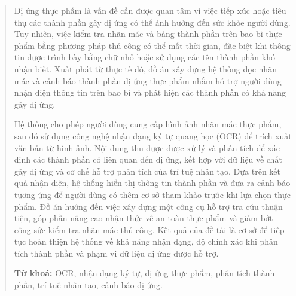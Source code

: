 \begin{abstract}

Dị ứng thực phẩm là vấn đề cần được quan tâm vì việc tiếp xúc hoặc tiêu thụ các thành phần gây dị ứng có thể ảnh hưởng đến sức khỏe người dùng. Tuy nhiên, việc kiểm tra nhãn mác và bảng thành phần trên bao bì thực phẩm bằng phương pháp thủ công có thể mất thời gian, đặc biệt khi thông tin được trình bày bằng chữ nhỏ hoặc sử dụng các tên thành phần khó nhận biết. Xuất phát từ thực tế đó, đồ án xây dựng hệ thống đọc nhãn mác và cảnh báo thành phần dị ứng thực phẩm nhằm hỗ trợ người dùng nhận diện thông tin trên bao bì và phát hiện các thành phần có khả năng gây dị ứng.

Hệ thống cho phép người dùng cung cấp hình ảnh nhãn mác thực phẩm, sau đó sử dụng công nghệ nhận dạng ký tự quang học (OCR) để trích xuất văn bản từ hình ảnh. Nội dung thu được được xử lý và phân tích để xác định các thành phần có liên quan đến dị ứng, kết hợp với dữ liệu về chất gây dị ứng và cơ chế hỗ trợ phân tích của trí tuệ nhân tạo. Dựa trên kết quả nhận diện, hệ thống hiển thị thông tin thành phần và đưa ra cảnh báo tương ứng để người dùng có thêm cơ sở tham khảo trước khi lựa chọn thực phẩm. Đồ án hướng đến việc xây dựng một công cụ hỗ trợ tra cứu thuận tiện, góp phần nâng cao nhận thức về an toàn thực phẩm và giảm bớt công sức kiểm tra nhãn mác thủ công. Kết quả của đề tài là cơ sở để tiếp tục hoàn thiện hệ thống về khả năng nhận dạng, độ chính xác khi phân tích thành phần và phạm vi dữ liệu dị ứng được hỗ trợ.

\vspace{0.8em}
\noindent\textbf{Từ khoá:} OCR, nhận dạng ký tự, dị ứng thực phẩm, phân tích thành phần, trí tuệ nhân tạo, cảnh báo dị ứng.


\end{abstract}
